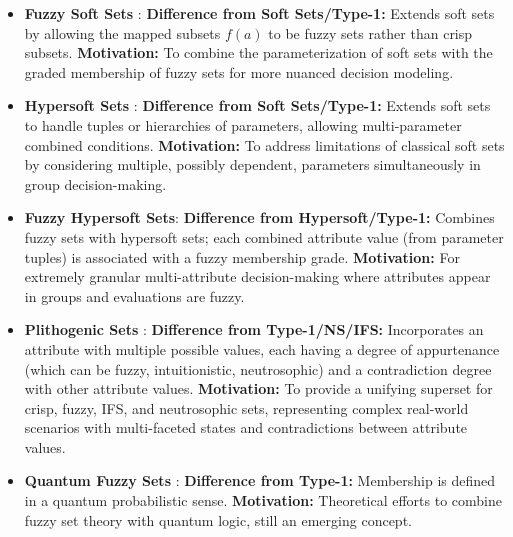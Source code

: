 \begin{itemize}
    \item \textbf{Fuzzy Soft Sets} \cite{MajiBiswasRoy2001_FuzzySoft}: \textbf{Difference from Soft Sets/Type-1:} Extends soft sets by allowing the mapped subsets $f(a)$ to be fuzzy sets rather than crisp subsets. \textbf{Motivation:} To combine the parameterization of soft sets with the graded membership of fuzzy sets for more nuanced decision modeling.

    \item \textbf{Hypersoft Sets} \cite{Smarandache2018_Hypersoft}: \textbf{Difference from Soft Sets/Type-1:} Extends soft sets to handle tuples or hierarchies of parameters, allowing multi-parameter combined conditions. \textbf{Motivation:} To address limitations of classical soft sets by considering multiple, possibly dependent, parameters simultaneously in group decision-making.

    \item \textbf{Fuzzy Hypersoft Sets}: \textbf{Difference from Hypersoft/Type-1:} Combines fuzzy sets with hypersoft sets; each combined attribute value (from parameter tuples) is associated with a fuzzy membership grade. \textbf{Motivation:} For extremely granular multi-attribute decision-making where attributes appear in groups and evaluations are fuzzy.

    \item \textbf{Plithogenic Sets} \cite{Smarandache2018_Plithogenic}: \textbf{Difference from Type-1/NS/IFS:} Incorporates an attribute with multiple possible values, each having a degree of appurtenance (which can be fuzzy, intuitionistic, neutrosophic) and a contradiction degree with other attribute values. \textbf{Motivation:} To provide a unifying superset for crisp, fuzzy, IFS, and neutrosophic sets, representing complex real-world scenarios with multi-faceted states and contradictions between attribute values.

    \item \textbf{Quantum Fuzzy Sets} \cite{Pykacz2015_Quantum}: \textbf{Difference from Type-1:} Membership is defined in a quantum probabilistic sense. \textbf{Motivation:} Theoretical efforts to combine fuzzy set theory with quantum logic, still an emerging concept.
\end{itemize}
